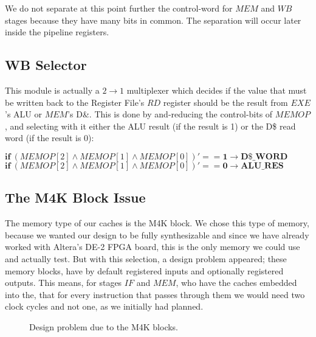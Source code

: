We do not separate at this point further the control-word for $MEM$ and $WB$ stages because they have many bits in common. The separation will occur later inside the pipeline registers.

\subsection{\textcolor{burgundy}{WB Selector}}
\label{SubSec3.6.3:WBSEL}
This module is actually a $2\rightarrow1$ multiplexer which decides if the value that must be written back to the Register File's $RD$ register should be the result from $EXE$'s ALU or $MEM$'s D\&. This is done by and-reducing the control-bits of $MEMOP$, and selecting with it either the ALU result (if the result is 1) or the D\$ read word (if the result is 0):

 \begin{center}
	$\mathbf{if}$$ \ (MEMOP[2] \land MEMOP[1] \land MEMOP[0])' == \mathbf{1 \rightarrow D\$\_WORD}$ \\
	$\mathbf{if}$$ \ (MEMOP[2] \land MEMOP[1] \land MEMOP[0])' == \mathbf{0 \rightarrow ALU\_RES}$ \\
\end{center}

\clearpage

\subsection{The M4K Block Issue}

The memory type of our caches is the M4K block. We chose this type of memory, because we wanted our design to be fully synthesizable and since we have already worked with Altera's DE-2 FPGA board, this is the only memory we could use and actually test. But with this selection, a design problem appeared; these memory blocks, have by default registered inputs and optionally registered outputs. This means, for stages $IF$ and $MEM$, who have the caches embedded into the, that for every instruction that passes through them we would need two clock cycles and not one, as we initially had planned.

\begin{figure}[h!]
	\begin{center}
		\caption{Design problem due to the M4K blocks.}
		\label{Image3.17}
	\end{center}
\end{figure}

